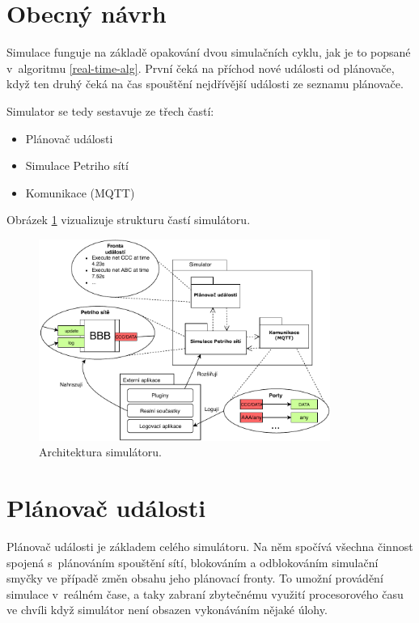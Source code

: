\section{Obecný návrh}

Simulace funguje na základě opakování dvou simulačních cyklu, jak je to popsané v~algoritmu \ref{real-time-alg}. První čeká na příchod nové události od plánovače, když ten druhý čeká na čas spouštění nejdřívější události ze seznamu plánovače.

Simulator se tedy sestavuje ze třech častí:

\begin{itemize}
  \item Plánovač události
  \item Simulace Petriho sítí
  \item Komunikace (MQTT)
\end{itemize}

Obrázek \ref{fig:sim-arch} vizualizuje strukturu častí simulátoru.

\begin{figure}[htb]
  \centering
  \includegraphics[width=0.85\textwidth]{obrazky-figures/sim-arch.pdf}
  \caption{Architektura simulátoru.}
  \label{fig:sim-arch}
\end{figure}

\section{Plánovač události}

Plánovač události je základem celého simulátoru. Na něm spočívá všechna činnost spojená s~plánováním spouštění sítí, blokováním a odblokováním simulační smyčky ve případě změn obsahu jeho plánovací fronty. To umožní provádění simulace v~reálném čase, a taky zabraní zbytečnému využití procesorového času ve chvíli když simulátor není obsazen vykonáváním nějaké úlohy.

